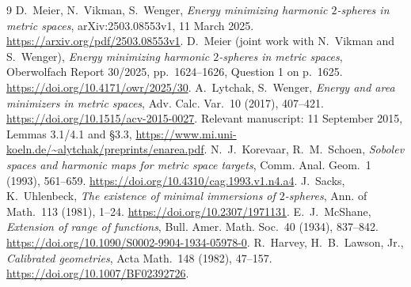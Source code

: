 \documentclass[11pt]{article}
\begin{document}
\begin{thebibliography}{9}
 D.~Meier, N.~Vikman, S.~Wenger,
\emph{Energy minimizing harmonic $2$-spheres in metric spaces},
arXiv:2503.08553v1, 11 March 2025.
\url{https://arxiv.org/pdf/2503.08553v1}.
 D.~Meier (joint work with N.~Vikman and S.~Wenger),
\emph{Energy minimizing harmonic $2$-spheres in metric spaces},
Oberwolfach Report 30/2025, pp.~1624--1626, Question 1 on p.~1625.
\url{https://doi.org/10.4171/owr/2025/30}.
 A.~Lytchak, S.~Wenger,
\emph{Energy and area minimizers in metric spaces},
Adv. Calc. Var.~10 (2017), 407--421.
\url{https://doi.org/10.1515/acv-2015-0027}.
Relevant manuscript: 11 September 2015, Lemmas 3.1/4.1 and \S3.3,
\url{https://www.mi.uni-koeln.de/~alytchak/preprints/enarea.pdf}.
 N.~J.~Korevaar, R.~M.~Schoen,
\emph{Sobolev spaces and harmonic maps for metric space targets},
Comm. Anal. Geom.~1 (1993), 561--659.
\url{https://doi.org/10.4310/cag.1993.v1.n4.a4}.
 J.~Sacks, K.~Uhlenbeck,
\emph{The existence of minimal immersions of $2$-spheres},
Ann. of Math.~113 (1981), 1--24.
\url{https://doi.org/10.2307/1971131}.
 E.~J.~McShane, \emph{Extension of range of functions},
Bull. Amer. Math. Soc.~40 (1934), 837--842.
\url{https://doi.org/10.1090/S0002-9904-1934-05978-0}.
 R.~Harvey, H.~B.~Lawson, Jr., \emph{Calibrated geometries},
Acta Math.~148 (1982), 47--157.
\url{https://doi.org/10.1007/BF02392726}.
\end{thebibliography}
\end{document}
